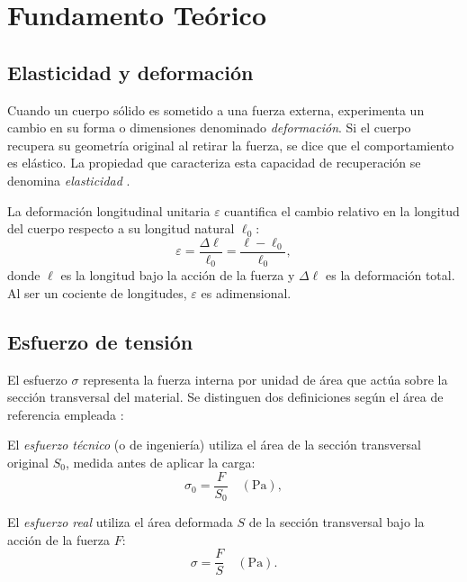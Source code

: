 
\section{Fundamento Teórico}

\subsection{Elasticidad y deformación}

Cuando un cuerpo sólido es sometido a una fuerza externa, experimenta un cambio en su
forma o dimensiones denominado \textit{deformación}. Si el cuerpo recupera su geometría
original al retirar la fuerza, se dice que el comportamiento es elástico. La propiedad
que caracteriza esta capacidad de recuperación se denomina \textit{elasticidad}
\cite{serway}.

La deformación longitudinal unitaria $\varepsilon$ cuantifica el cambio relativo en la
longitud del cuerpo respecto a su longitud natural $\ell_0$:
\begin{equation}
    \varepsilon = \frac{\Delta\ell}{\ell_0} = \frac{\ell - \ell_0}{\ell_0},
    \label{eq:deformacion_unitaria}
\end{equation}
donde $\ell$ es la longitud bajo la acción de la fuerza y $\Delta\ell$ es la deformación
total. Al ser un cociente de longitudes, $\varepsilon$ es adimensional.

\subsection{Esfuerzo de tensión}

El esfuerzo $\sigma$ representa la fuerza interna por unidad de área que actúa sobre la
sección transversal del material. Se distinguen dos definiciones según el área de
referencia empleada \cite{halliday}:

El \textit{esfuerzo técnico} (o de ingeniería) utiliza el área de la sección transversal
original $S_0$, medida antes de aplicar la carga:
\begin{equation}
    \sigma_0 = \frac{F}{S_0} \quad (\unit{\pascal}),
    \label{eq:esfuerzo_tecnico}
\end{equation}

El \textit{esfuerzo real} utiliza el área deformada $S$ de la sección transversal bajo
la acción de la fuerza $F$:
\begin{equation}
    \sigma = \frac{F}{S} \quad (\unit{\pascal}).
    \label{eq:esfuerzo_real}
\end{equation}

